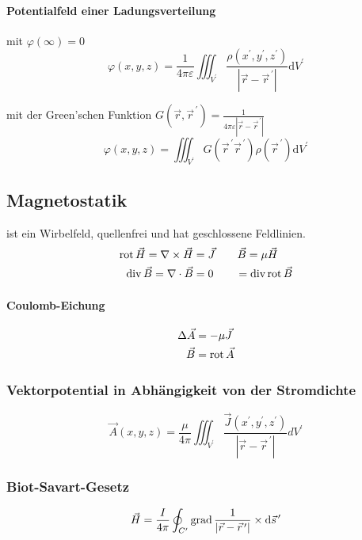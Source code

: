 \paragraph*{Potentialfeld einer Ladungsverteilung}
mit $\varphi(\infty)=0$
\[
    \varphi(x, y, z)=\frac{1}{4 \pi \varepsilon} \iiint_{V^{\prime}}
    \frac{\rho\left(x^{\prime}, y^{\prime},
        z^{\prime}\right)}{\left|\vec{r}-\vec{r}^{\,\prime}\right|} \mathrm{d}
    V^{\prime}
\]

mit der Green'schen Funktion $G\left(\vec{r}, \vec{r}^{\,\prime}\right)=\frac{1}{4 \pi \varepsilon\left|\vec{r}-\vec{r}^{\,\prime}\right|}$
\[\varphi(x, y, z)=\iiint_{V^{\prime}} G\left(\vec{r}^{\,\prime} \vec{r}^{\,\prime}\right) \rho\left(\vec{r}^{\,\prime}\right) \mathrm{d} V^{\prime}\]


\subsection{Magnetostatik}
ist ein Wirbelfeld, quellenfrei und hat geschlossene Feldlinien.
\begin{align*}
    \operatorname{rot} \vec{H} = \nabla \times \vec{H} & = \vec{J}  \qquad \vec{B} = \mu \vec{H}   \\
    \operatorname{div} \vec{B} = \nabla \cdot \vec{B}  & = 0        \qquad = \operatorname{div} \operatorname{rot} \vec{B}
\end{align*}

\paragraph*{Coulomb-Eichung}
\begin{align*}
    \Delta \vec{A} & = - \mu \vec{J}  \\
    \vec{B}        & = \operatorname{rot} \vec{A}
\end{align*}

\subsubsection{Vektorpotential in Abhängigkeit von der Stromdichte}
\[ \vec{A}(x, y, z)=\frac{\mu}{4 \pi} \iiint_{V^{\prime}} \frac{\vec{J}\left(x^{\prime}, y^{\prime}, z^{\prime}\right)}{\left|\vec{r}-\vec{r}^{\,\prime}\right|} d V^{\prime} \]

\subsubsection{Biot-Savart-Gesetz}
\[
    \vec{H}=\frac{I}{4 \pi} \oint_{C^{\prime}} \operatorname{grad} \frac{1}{\left|\vec{r}-\vec{r}^{\,\prime}\right|} \times \mathrm{d} \vec{s}^{\,\prime}
\]

